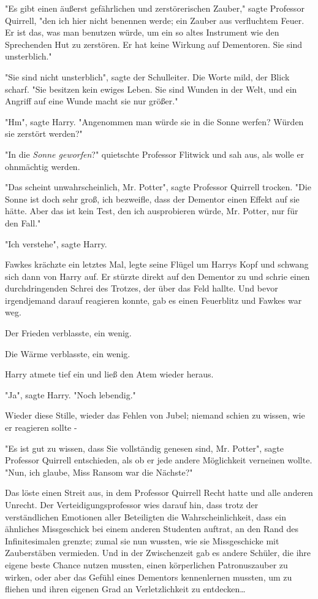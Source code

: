 {"Es gibt einen äußerst gefährlichen und zerstörerischen Zauber," sagte Professor Quirrell, "den ich hier nicht benennen werde; ein Zauber aus verfluchtem Feuer. Er ist das, was man benutzen würde, um ein so altes Instrument wie den Sprechenden Hut zu zerstören. Er hat keine Wirkung auf Dementoren. Sie sind unsterblich."

"Sie sind nicht unsterblich", sagte der Schulleiter. Die Worte mild, der Blick scharf. "Sie besitzen kein ewiges Leben. Sie sind Wunden in der Welt, und ein Angriff auf eine Wunde macht sie nur größer."

"Hm", sagte Harry. "Angenommen man würde sie in die Sonne werfen? Würden sie zerstört werden?"

"In die \emph{Sonne geworfen}?" quietschte Professor Flitwick und sah aus, als wolle er ohnmächtig werden.

"Das scheint unwahrscheinlich, Mr. Potter", sagte Professor Quirrell trocken. "Die Sonne ist doch sehr groß, ich bezweifle, dass der Dementor einen Effekt auf sie hätte. Aber das ist kein Test, den ich ausprobieren würde, Mr. Potter, nur für den Fall."

"Ich verstehe", sagte Harry.

Fawkes krächzte ein letztes Mal, legte seine Flügel um Harrys Kopf und schwang sich dann von Harry auf. Er stürzte direkt auf den Dementor zu und schrie einen durchdringenden Schrei des Trotzes, der über das Feld hallte. Und bevor irgendjemand darauf reagieren konnte, gab es einen Feuerblitz und Fawkes war weg.

Der Frieden verblasste, ein wenig.

Die Wärme verblasste, ein wenig.

Harry atmete tief ein und ließ den Atem wieder heraus.

"Ja", sagte Harry. "Noch lebendig."

Wieder diese Stille, wieder das Fehlen von Jubel; niemand schien zu wissen, wie er reagieren sollte -

"Es ist gut zu wissen, dass Sie vollständig genesen sind, Mr. Potter", sagte Professor Quirrell entschieden, als ob er jede andere Möglichkeit verneinen wollte. "Nun, ich glaube, Miss Ransom war die Nächste?"

Das löste einen Streit aus, in dem Professor Quirrell Recht hatte und alle anderen Unrecht. Der Verteidigungsprofessor wies darauf hin, dass trotz der verständlichen Emotionen aller Beteiligten die Wahrscheinlichkeit, dass ein ähnliches Missgeschick bei einem anderen Studenten auftrat, an den Rand des Infinitesimalen grenzte; zumal sie nun wussten, wie sie Missgeschicke mit Zauberstäben vermieden. Und in der Zwischenzeit gab es andere Schüler, die ihre eigene beste Chance nutzen mussten, einen körperlichen Patronuszauber zu wirken, oder aber das Gefühl eines Dementors kennenlernen mussten, um zu fliehen und ihren eigenen Grad an Verletzlichkeit zu entdecken…

}
